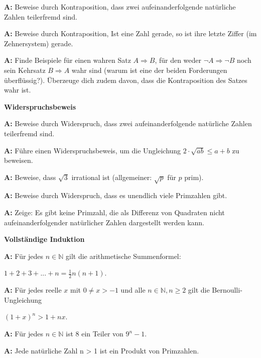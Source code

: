 \documentclass[landscape,twocolumn,a4paper]{article}
\begin{document}
\textbf{A:} Beweise durch Kontraposition, dass zwei aufeinanderfolgende natürliche Zahlen teilerfremd sind.
\bigskip {}

\textbf{A:} Beweise durch Kontraposition, Ist eine Zahl gerade, so ist ihre
letzte Ziffer (im Zehnersystem) gerade.
\bigskip {}

\textbf{A:} Finde Beispiele für einen wahren Satz $A \Rightarrow B$, für den weder
$\lnot A \Rightarrow \lnot B$ noch sein Kehrsatz $B \Rightarrow A$ wahr sind (warum ist eine der beiden
Forderungen überflüssig?). Überzeuge dich zudem davon, dass die Kontraposition
des Satzes wahr ist.
\bigskip {}



\textbf{Widerspruchsbeweis}
\bigskip 

\textbf{A:} Beweise durch Widerspruch, dass zwei aufeinanderfolgende natürliche Zahlen teilerfremd sind.
\bigskip {}

\textbf{A:} Führe einen Widerspruchsbeweis, um die Ungleichung $2 \cdot \sqrt{ab} \le a + b$ zu 
beweisen.
\bigskip {}

\textbf{A:} Beweise, dass $\sqrt{3}$ irrational ist (allgemeiner: $\sqrt{p}$ für $p$ prim).
\bigskip {}

\textbf{A:} Beweise durch Widerspruch, dass es unendlich viele Primzahlen gibt.
\bigskip {}

\textbf{A:} Zeige: Es gibt keine Primzahl, die als Differenz von Quadraten nicht aufeinanderfolgender natürlicher Zahlen dargestellt werden kann.
\bigskip {}

\textbf{Vollständige Induktion}
\bigskip 

\textbf{A:} Für jedes $n \in \mathbb{N}$ gilt die
arithmetische Summenformel: 

$ 1 + 2 + 3 + ... + n = \frac{1}{2}n(n+1)$.
\bigskip {}

\textbf{A:}  Für jedes reelle $x$ mit $0 \ne x > -1$
und alle $n \in \mathbb{N}, n \ge 2$ gilt die Bernoulli-Ungleichung

$ (1 + x)^n > 1 +nx$.
\bigskip {}

\textbf{A:}  Für jedes $n \in \mathbb{N}$ ist 8 ein Teiler von $9^n - 1$.
\bigskip {}

\textbf{A:} Jede natürliche Zahl n > 1 ist ein Produkt von Primzahlen.
\bigskip {}
\end{document}
